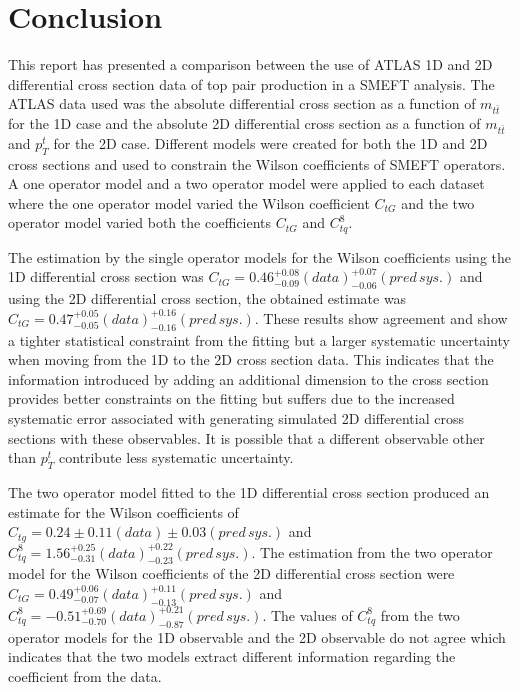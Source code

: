 \documentclass[a4paper,11pt]{article}
\begin{document}
\section{Conclusion}

This report has presented a comparison between the use of ATLAS 1D and 2D differential cross section data of top pair production in a SMEFT analysis.
The ATLAS data used was the absolute differential cross section as a function of $m_{t\bar{t}}$ for the 1D case and the absolute 2D differential cross section as a function of $m_{t\bar{t}}$ and $p_{T}^{t}$ for the 2D case.
Different models were created for both the 1D and 2D cross sections and used to constrain the Wilson coefficients of SMEFT operators.
A one operator model and a two operator model were applied to each dataset where the one operator model varied the Wilson coefficient $C_{tG}$ and the two operator model varied both the coefficients $C_{tG}$ and $C_{tq}^8$.

The estimation by the single operator models for the Wilson coefficients using the 1D differential cross section was $C_{tG}=0.46^{+0.08}_{-0.09}(data)^{+0.07}_{-0.06}(pred\,sys.)$ and using the 2D differential cross section, the obtained estimate was $C_{tG}=0.47^{+0.05}_{-0.05}(data)^{+0.16}_{-0.16}(pred\,sys.)$.
These results show agreement and show a tighter statistical constraint from the fitting but a larger systematic uncertainty when moving from the 1D to the 2D cross section data.
This indicates that the information introduced by adding an additional dimension to the cross section provides better constraints on the fitting but suffers due to the increased systematic error associated with generating simulated 2D differential cross sections with these observables.
It is possible that a different observable other than $p_{T}^{t}$ contribute less systematic uncertainty.


The two operator model fitted to the 1D differential cross section produced an estimate for the Wilson coefficients of $C_{tg} = 0.24 \pm 0.11 (data) \pm 0.03 (pred\,sys.)$ and $C_{tq}^{8}=1.56^{+0.25}_{-0.31} (data) ^{+0.22}_{-0.23} (pred\,sys.)$.
The estimation from the two operator model for the Wilson coefficients of the 2D differential cross section were $C_{tG} = 0.49_{-0.07}^{+0.06}(data) ^{+0.11}_{-0.13} (pred\,sys.)$ and $C_{tq}^{8}=-0.51_{-0.70}^{+0.69} (data) ^{+0.21}_{-0.87} (pred\,sys.)$.
The values of $C_{tq}^{8}$ from the two operator models for the 1D observable and the 2D observable do not agree which indicates that the two models extract different information regarding the coefficient from the data.
\end{document}
